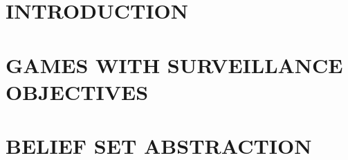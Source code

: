 \documentclass[letterpaper, 10 pt, conference]{ieeeconf}  %
\begin{document}

\section{INTRODUCTION}




\section{GAMES WITH SURVEILLANCE OBJECTIVES}



\section{BELIEF SET ABSTRACTION}





\end{document}
